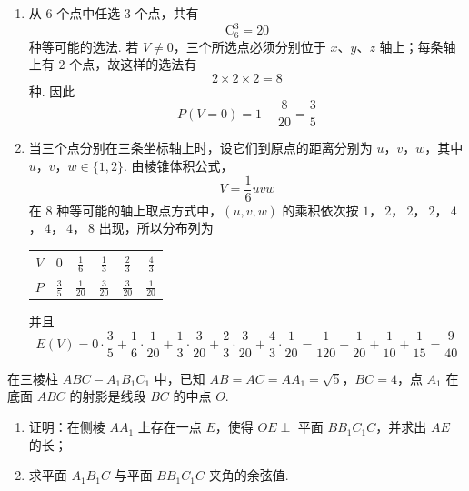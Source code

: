 \begin{solution}
\begin{enumerate}
\item 从 \(6\) 个点中任选 \(3\) 个点，共有
\[
\mathrm C_6^3=20
\]
种等可能的选法. 若 \(V\neq0\)，三个所选点必须分别位于 \(x\)、\(y\)、\(z\) 轴上；每条轴上有 \(2\) 个点，故这样的选法有
\[
2\times2\times2=8
\]
种. 因此
\[
P(V=0)=1-\frac8{20}=\frac35
\]

\item 当三个点分别在三条坐标轴上时，设它们到原点的距离分别为 \(u\)，\(v\)，\(w\)，其中 \(u\)，\(v\)，\(w\in\{1,2\}\). 由棱锥体积公式，
\[
V=\frac16uvw
\]
在 \(8\) 种等可能的轴上取点方式中，\((u,v,w)\) 的乘积依次按
\(1\)，\(\ 2\)，\(\ 2\)，\(\ 2\)，\(\ 4\)，\(\ 4\)，\(\ 4\)，\(\ 8\)
出现，所以分布列为

\begin{center}
\begin{tabular}{c|ccccc}
\(V\) & \(0\) & \(\frac{1}{6}\) & \(\frac{1}{3}\) & \(\frac{2}{3}\) & \(\frac{4}{3}\) \\
\hline
\(P\) & \(\frac{3}{5}\) & \(\frac{1}{20}\) & \(\frac{3}{20}\) & \(\frac{3}{20}\) & \(\frac{1}{20}\)
\end{tabular}
\end{center}

并且
\[
E(V)=0\cdot\frac35+\frac16\cdot\frac1{20}
+\frac13\cdot\frac3{20}
+\frac23\cdot\frac3{20}
+\frac43\cdot\frac1{20}
=\frac1{120}+\frac1{20}+\frac1{10}+\frac1{15}
=\frac9{40}
\]
\end{enumerate}
\end{solution}

\begin{problem}
在三棱柱 \(ABC - A_{1}B_{1}C_{1}\) 中，已知 \(AB = AC = AA_{1} = \sqrt{5}\)，\(BC = 4\)，点 \(A_{1}\) 在底面 \(ABC\) 的射影是线段 \(BC\) 的中点 \(O\).
\begin{enumerate}
\item 证明：在侧棱 \(AA_{1}\) 上存在一点 \(E\)，使得 \(OE \perp \) 平面 \(BB_{1}C_{1}C\)，并求出 \(AE\) 的长；
\item 求平面 \(A_{1}B_{1}C\) 与平面 \(BB_{1}C_{1}C\) 夹角的余弦值.
\end{enumerate}

\end{problem}

